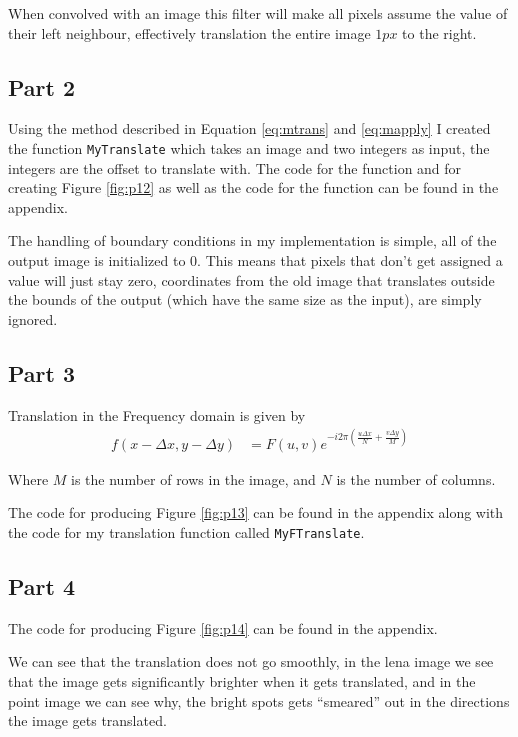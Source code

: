 When convolved with an image this filter will make all pixels assume the value of their left
neighbour, effectively translation the entire image $1px$ to the right.

\subsection{Part 2}

Using the method described in Equation \ref{eq:mtrans} and \ref{eq:mapply} I
created the function \texttt{MyTranslate} which takes an image and two integers
as input, the integers are the offset to translate with. The code for the
function and for creating Figure \ref{fig:p12} as well as the code for the
function can be found in the appendix.


The handling of boundary conditions in my implementation is simple, all of the output
image is initialized to 0. This means that pixels that don't get assigned a
value will just stay zero, coordinates from the old image that translates
outside the bounds of the output (which have the same size as the input), are
simply ignored.

\subsection{Part 3}

Translation in the Frequency domain is given by
\begin{align}
    f(x-\Delta x, y-\Delta y) &= F(u,v) e^{-i2\pi (\frac{u\Delta x}{N} + \frac{v\Delta y}{M})}
\end{align}

Where $M$ is the number of rows in the image, and $N$ is the number of columns.


The code for producing Figure \ref{fig:p13} can be found in the appendix along
with the code for my translation function called \texttt{MyFTranslate}.

\subsection{Part 4}

The code for producing Figure \ref{fig:p14} can be found in the appendix.


We can see that the translation does not go smoothly, in the lena image we see
that the image gets significantly brighter when it gets translated, and in the
point image we can see why, the bright spots gets ``smeared'' out in the
directions the image gets translated.
